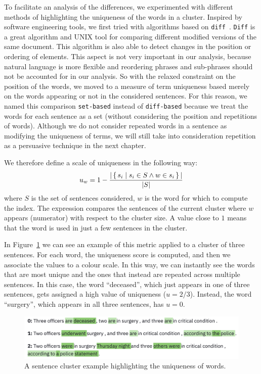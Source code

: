 To facilitate an analysis of the differences, we experimented with different methods of highlighting the uniqueness of the words in a cluster.
Inspired by software engineering tools, we first tried with algorithms based on \texttt{diff}~\citep{myers1986ano}.
\texttt{Diff} is a great algorithm and UNIX tool for comparing different modified versions of the same document.
This algorithm is also able to detect changes in the position or ordering of elements. This aspect is not very important in our analysis, because natural language is more flexible and reordering phrases and sub-phrases should not be accounted for in our analysis. So with the relaxed constraint on the position of the words, we moved to a measure of term uniqueness based merely on the words appearing or not in the considered sentences. For this reason, we named this comparison \texttt{set-based} instead of \texttt{diff-based} because we treat the words for each sentence as a set (without considering the position and repetitions of words).
Although we do not consider repeated words in a sentence as modifying the uniqueness of terms, we will still take into consideration repetition as a persuasive technique in the next chapter.

We therefore define a scale of uniqueness in the following way:
$$u_w = 1 - \frac{|\set{s_i | s_i \in S \land w \in s_i}|}{|S|}$$
where $S$ is the set of sentences considered, $w$ is the word for which to compute the index. The expression compares the sentences of the current cluster where $w$ appears (numerator) with respect to the cluster size.
A value close to $1$ means that the word is used in just a few sentences in the cluster.

In Figure~\ref{fig:words_uniqueness} we can see an example of this metric applied to a cluster of three sentences.
For each word, the uniqueness score is computed, and then we associate the values to a colour scale.
In this way, we can instantly see the words that are most unique and the ones that instead are repeated across multiple sentences.
In this case, the word ``deceased'', which just appears in one of three sentences, gets assigned a high value of uniqueness ($u = 2/3$). Instead, the word ``surgery'', which appears in all three sentences, has $u = 0$.

\begin{figure}[!htb]
    \centering
    \includegraphics[width=\textwidth]{figures/words_uniqueness.png}
    \caption{A sentence cluster example highlighting the uniqueness of words.}
    \label{fig:words_uniqueness}
\end{figure}


